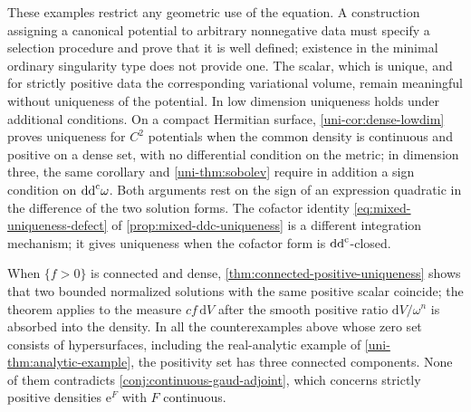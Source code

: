 These examples restrict any geometric use of the equation. A construction assigning a canonical potential to arbitrary nonnegative data must specify a selection procedure and prove that it is well defined; existence in the minimal ordinary singularity type does not provide one. The scalar, which is unique, and for strictly positive data the corresponding variational volume, remain meaningful without uniqueness of the potential. In low dimension uniqueness holds under additional conditions. On a compact Hermitian surface, \cref{uni-cor:dense-lowdim} proves uniqueness for $C^2$ potentials when the common density is continuous and positive on a dense set, with no differential condition on the metric; in dimension three, the same corollary and \cref{uni-thm:sobolev} require in addition a sign condition on $\mathrm{dd}^{\mathrm{c}}\omega$. Both arguments rest on the sign of an expression quadratic in the difference of the two solution forms. The cofactor identity \eqref{eq:mixed-uniqueness-defect} of \cref{prop:mixed-ddc-uniqueness} is a different integration mechanism; it gives uniqueness when the cofactor form is $\mathrm{dd}^{\mathrm{c}}$-closed.

When $\{f>0\}$ is connected and dense, \cref{thm:connected-positive-uniqueness} shows that two bounded normalized solutions with the same positive scalar coincide; the theorem applies to the measure $cf\,\mathrm{d}V$ after the smooth positive ratio $\mathrm{d}V/\omega^n$ is absorbed into the density. In all the counterexamples above whose zero set consists of hypersurfaces, including the real-analytic example of \cref{uni-thm:analytic-example}, the positivity set has three connected components. None of them contradicts \cref{conj:continuous-gaud-adjoint}, which concerns strictly positive densities $\mathrm{e}^F$ with $F$ continuous.

